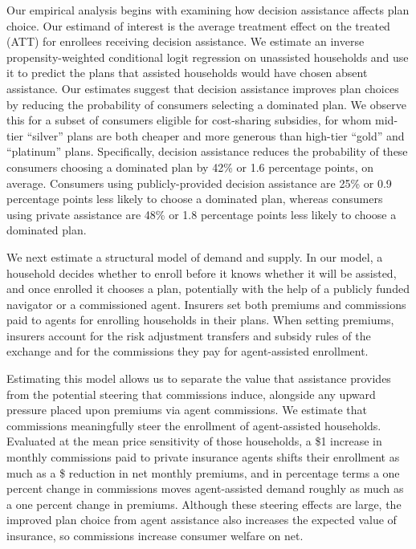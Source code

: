 \documentclass[12pt]{article}
\begin{document}
Our empirical analysis begins with examining how decision assistance affects plan choice. Our estimand of interest is the average treatment effect on the treated (ATT) for enrollees receiving decision assistance. We estimate an inverse propensity-weighted conditional logit regression on unassisted households and use it to predict the plans that assisted households would have chosen absent assistance. Our estimates suggest that decision assistance improves plan choices by reducing the probability of consumers selecting a dominated plan. We observe this for a subset of consumers eligible for cost-sharing subsidies, for whom mid-tier ``silver'' plans are both cheaper and more generous than high-tier ``gold'' and ``platinum'' plans. Specifically, decision assistance reduces the probability of these consumers choosing a dominated plan by 42\% or 1.6 percentage points, on average. Consumers using publicly-provided decision assistance are 25\% or 0.9 percentage points less likely to choose a dominated plan, whereas consumers using private assistance are 48\% or 1.8 percentage points less likely to choose a dominated plan.




We next estimate a structural model of demand and supply. In our model, a household decides whether to enroll before it knows whether it will be assisted, and once enrolled it chooses a plan, potentially with the help of a publicly funded navigator or a commissioned agent. Insurers set both premiums and commissions paid to agents for enrolling households in their plans. When setting premiums, insurers account for the risk adjustment transfers and subsidy rules of the exchange and for the commissions they pay for agent-assisted enrollment. 

Estimating this model allows us to separate the value that assistance provides from the potential steering that commissions induce, alongside any upward pressure placed upon premiums via agent commissions. We estimate that commissions meaningfully steer the enrollment of agent-assisted households. Evaluated at the mean price sensitivity of those households, a \$1 increase in monthly commissions paid to private insurance agents shifts their enrollment as much as a \$\commPremRatio{} reduction in net monthly premiums, and in percentage terms a one percent change in commissions moves agent-assisted demand roughly \commPremElast{} as much as a one percent change in premiums. Although these steering effects are large, the improved plan choice from agent assistance also increases the expected value of insurance, so commissions increase consumer welfare on net.
\end{document}
